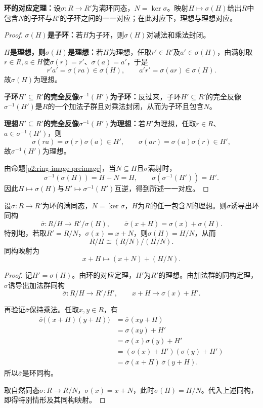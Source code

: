 \begin{theorem}\label{p2:ring-correspondence}
\textbf{环的对应定理：}设$\sigma:R\to R'$为满环同态，$N=\ker\sigma$。映射$H\mapsto\sigma(H)$给出$R$中包含$N$的子环与$R'$的子环之间的一一对应；在此对应下，理想与理想对应。
\end{theorem}
\begin{proof}
\textbf{$\sigma(H)$是子环：}若$H$为子环，则$\sigma(H)$对减法和乘法封闭。

\textbf{$H$是理想，则$\sigma(H)$是理想：}若$H$为理想，任取$r'\in R'$及$a'\in\sigma(H)$，由满射取$r\in R,a\in H$使$\sigma(r)=r'$、$\sigma(a)=a'$，于是
\[
r'a'=\sigma(ra)\in\sigma(H),\qquad a'r'=\sigma(ar)\in\sigma(H).
\]
故$\sigma(H)$为理想。

\textbf{子环$H'\subseteq R'$的完全反像$\sigma^{-1}(H')$为子环：}反过来，子环$H'\subseteq R'$的完全反像$\sigma^{-1}(H')$是$R$的一个加法子群且对乘法封闭，从而为子环且包含$N$。

\textbf{理想$H'\subseteq R'$的完全反像$\sigma^{-1}(H')$为理想：}若$H'$为理想，任取$r\in R$、$a\in\sigma^{-1}(H')$，则
\[
\sigma(ra)=\sigma(r)\sigma(a)\in H',\qquad
\sigma(ar)=\sigma(a)\sigma(r)\in H',
\]
故$\sigma^{-1}(H')$为理想。

由命题\ref{p2:ring-image-preimage}，当$N\subseteq H$且$\sigma$满射时，
\[
\sigma^{-1}(\sigma(H))=H+N=H,\qquad
\sigma(\sigma^{-1}(H'))=H'.
\]
因此$H\mapsto\sigma(H)$与$H'\mapsto\sigma^{-1}(H')$互逆，得到所述一一对应。
\end{proof}

\begin{theorem}\label{p2:ring-third-iso}
设$\sigma:R\to R'$为环的满同态，$N=\ker\sigma$，$H$为$R$的任一包含$N$的理想。则$\sigma$诱导出环同构
\[
\overline\sigma:R/H\longrightarrow R'/\sigma(H),
\qquad
\overline\sigma(x+H)=\sigma(x)+\sigma(H).
\]
特别地，若取$R'=R/N$，$\sigma(x)=x+N$，则$\sigma(H)=H/N$，从而
\[
R/H\cong(R/N)/(H/N).
\]
同构映射为
\[
x+H\longmapsto(x+N)+(H/N).
\]
\end{theorem}
\begin{proof}
记$H'=\sigma(H)$。由环的对应定理，$H'$为$R'$的理想。由加法群的同构定理，$\sigma$诱导出加法群同构
\[
\overline\sigma:R/H\longrightarrow R'/H',
\qquad x+H\longmapsto\sigma(x)+H'.
\]

再验证$\overline\sigma$保持乘法。任取$x,y\in R$，有
\begin{align*}
\overline\sigma\bigl((x+H)(y+H)\bigr)
&=\overline\sigma(xy+H)\\
&=\sigma(xy)+H'\\
&=\sigma(x)\sigma(y)+H'\\
&=(\sigma(x)+H')(\sigma(y)+H')\\
&=\overline\sigma(x+H)\,\overline\sigma(y+H).
\end{align*}
所以$\overline\sigma$是环同构。

取自然同态$\sigma:R\to R/N$，$\sigma(x)=x+N$，此时$\sigma(H)=H/N$。代入上述同构，即得特别情形及其同构映射。
\end{proof}

